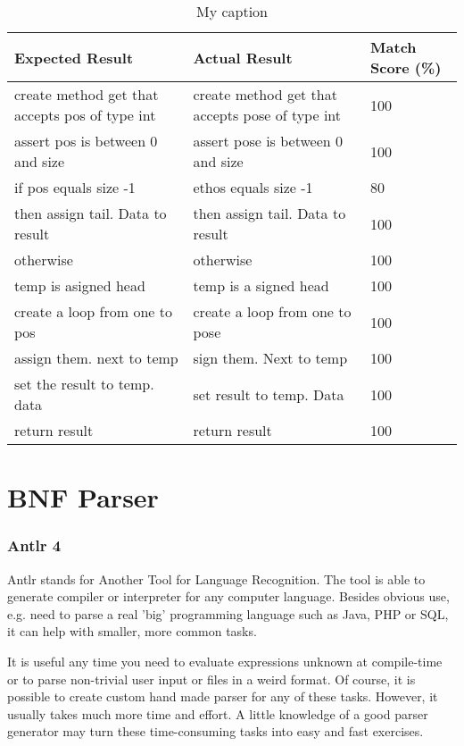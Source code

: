 \begin{table}[H]
	\centering
	\begin{tabular}{|p{6cm}|p{6cm}|p{2cm}|}
		\hline
		{\bf Expected Result} & {\bf Actual Result} & {\bf Match Score (\%)} \\ \hline
		create method get that accepts pos of type int & create method get that accepts pose of type int & 100 \\ \hline
		assert pos is between 0 and size & assert pose is between 0 and size & 100 \\ \hline
		if pos equals size -1 & ethos equals size -1 & 80 \\ \hline
		then assign tail. Data to result & then assign tail. Data to result & 100 \\ \hline
		otherwise & otherwise & 100 \\ \hline
		temp is asigned head & temp is a signed head & 100 \\ \hline
		create a loop from one to pos & create a loop from one to pose & 100 \\ \hline
		assign them. next to temp & sign them. Next to temp & 100 \\ \hline
		set the result to temp. data & set result to temp. Data & 100 \\ \hline
		return result & return result & 100 \\ \hline
	\end{tabular}
	\caption{My caption}
	\label{tab17}
\end{table} 
\section{BNF Parser} \label{section:BNF Parser}
\subsubsection{Antlr 4}
Antlr stands for Another Tool for Language Recognition. The tool is able to generate compiler or interpreter for any computer language. Besides obvious use, e.g. need to parse a real 'big' programming language such as Java, PHP or SQL, it can help with smaller, more common tasks.

It is useful any time you need to evaluate expressions unknown at compile-time or to parse non-trivial user input or files in a weird format. Of course, it is possible to create custom hand made parser for any of these tasks. However, it usually takes much more time and effort. A little knowledge of a good parser generator may turn these time-consuming tasks into easy and fast exercises.

